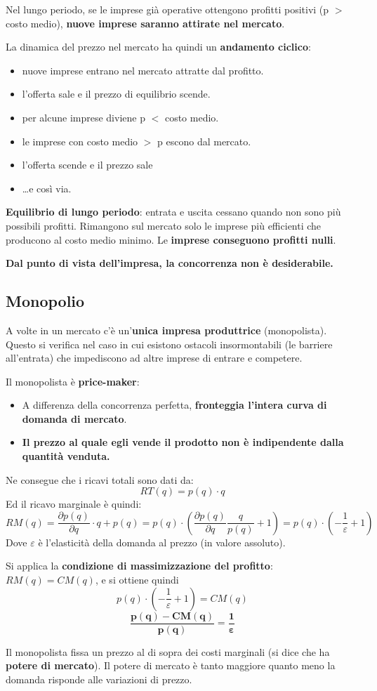 \documentclass[../main.tex]{subfiles}
\begin{document}
Nel lungo periodo, se le imprese già operative ottengono profitti positivi (p $>$ costo medio), \textbf{nuove imprese saranno attirate nel mercato}.

La dinamica del prezzo nel mercato ha quindi un \textbf{andamento ciclico}:

\begin{itemize}
    \item nuove imprese entrano nel mercato attratte dal profitto.
    \item l'offerta sale e il prezzo di equilibrio scende.
    \item per alcune imprese diviene p $<$ costo medio.
    \item le imprese con costo medio $>$ p escono dal mercato.
    \item l'offerta scende e il prezzo sale
    \item \dots e così via.
\end{itemize}

\textbf{Equilibrio di lungo periodo}: entrata e uscita cessano quando non sono più possibili profitti. Rimangono sul mercato solo le imprese più efficienti che producono al costo medio minimo. Le \textbf{imprese conseguono profitti nulli}.

\textbf{Dal punto di vista dell'impresa, la concorrenza non è desiderabile.}

\subsection{Monopolio}

A volte in un mercato c'è un'\textbf{unica impresa produttrice} (monopolista). 
Questo si verifica nel caso in cui esistono ostacoli insormontabili (le barriere all'entrata) che impediscono ad altre imprese di entrare e competere.

Il monopolista è \textbf{price-maker}:
\begin{itemize}
    \item A differenza della concorrenza perfetta, \textbf{fronteggia l'intera curva di domanda di mercato}.
    \item \textbf{Il prezzo al quale egli vende il prodotto non è indipendente dalla quantità venduta.}
\end{itemize}

Ne consegue che i ricavi totali sono dati da:
$$RT(q) = p(q)\cdot q$$
Ed il ricavo marginale è quindi:
$$
RM(q)=\frac{\partial p(q)}{\partial q}\cdot q + p(q) = p(q)\cdot \left(\frac{\partial p(q)}{\partial q}\frac{q}{p(q)}+1\right)=p(q)\cdot \left(-\frac{1}{\varepsilon}+1\right)
$$
Dove $\varepsilon$ è l'elasticità della domanda al prezzo (in valore assoluto).

Si applica la \textbf{condizione di massimizzazione del profitto}: $RM(q) = CM(q)$, e si ottiene quindi
$$p(q)\cdot \left(-\frac{1}{\varepsilon}+1\right)=CM(q)$$
$$\mathbf{\frac{p(q)-CM(q)}{p(q)} = \frac{1}{\bm\varepsilon}}$$

Il monopolista fissa un prezzo al di sopra dei costi marginali (si dice che ha \textbf{potere di mercato}). Il potere di mercato è tanto maggiore quanto meno la domanda risponde alle variazioni di prezzo.
\end{document}
